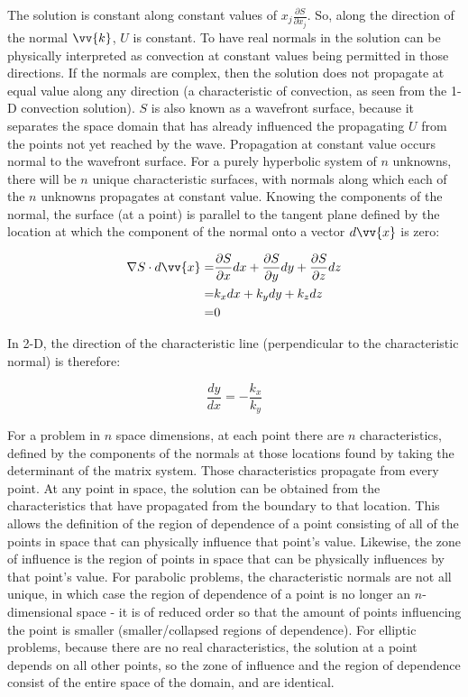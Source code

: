 \documentclass[10pt]{article}
\newcommand{\beq}{\begin{equation}}
\newcommand{\eeq}{\end{equation}}
\newcommand{\beqa}{\begin{equation}\begin{aligned}}
\newcommand{\eeqa}{\end{aligned}\end{equation}}
\begin{document}
\begin{flushleft}
The solution is constant along constant values of \(x_j\frac{\partial S}{\partial x_j}\). So, along the direction of the normal \(\vv{k}\), \(U\) is constant. To have real normals in the solution can be physically interpreted as convection at constant values being permitted in those directions. If the normals are complex, then the solution does not propagate at equal value along any direction (a characteristic of convection, as seen from the 1-D convection solution). \(S\) is also known as a wavefront surface, because it separates the space domain that has already influenced the propagating \(U\) from the points not yet reached by the wave. Propagation at constant value occurs normal to the wavefront surface. For a purely hyperbolic system of \(n\) unknowns, there will be \(n\) unique characteristic surfaces, with normals along which each of the \(n\) unknowns propagates at constant value. Knowing the components of the normal, the surface (at a point) is parallel to the tangent plane defined by the location at which the component of the normal onto a vector \(d\vv{x}\) is zero:

\beqa
\nabla S\cdot d\vv{x}=&\frac{\partial S}{\partial x}dx+\frac{\partial S}{\partial y}dy+\frac{\partial S}{\partial z}dz\\
=&k_xdx+k_ydy+k_zdz\\
=&0
\eeqa

In 2-D, the direction of the characteristic line (perpendicular to the characteristic normal) is therefore:

\beq
\frac{dy}{dx}=-\frac{k_x}{k_y}
\eeq

For a problem in \(n\) space dimensions, at each point there are \(n\) characteristics, defined by the components of the normals at those locations found by taking the determinant of the matrix system. Those characteristics propagate from every point. At any point in space, the solution can be obtained from the characteristics that have propagated from the boundary to that location. This allows the definition of the region of dependence of a point consisting of all of the points in space that can physically influence that point's value. Likewise, the zone of influence is the region of points in space that can be physically influences by that point's value. For parabolic problems, the characteristic normals are not all unique, in which case the region of dependence of a point is no longer an \(n\)-dimensional space - it is of reduced order so that the amount of points influencing the point is smaller (smaller/collapsed regions of dependence). For elliptic problems, because there are no real characteristics, the solution at a point depends on all other points, so the zone of influence and the region of dependence consist of the entire space of the domain, and are identical.


\end{flushleft}
\end{document}
